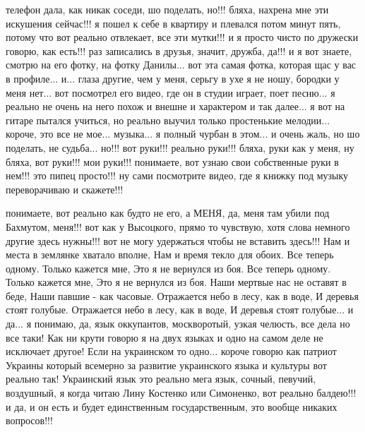 телефон дала, как никак соседи, шо поделать, но!!!
бляха, нахрена мне эти искушения сейчас!!!  я пошел к себе в квартиру и
плевался потом минут пять, потому что вот реально отвлекает, все эти мутки!!!
и я просто чисто по дружески говорю, как есть!!!  раз записались в друзья,
значит, дружба, да!!!  и я вот знаете, смотрю на его фотку, на фотку Данилы...
вот эта самая фотка, которая щас у вас в профиле...  и... глаза другие, чем у меня, серьгу
в ухе я не ношу, бородки у меня нет... вот посмотрел его видео, где он в студии
играет, поет песню...  я реально не очень на него похож и внешне и характером и
так далее... я вот на гитаре пытался учиться, но реально выучил только
простенькие мелодии... короче, это все не мое...  музыка... я полный чурбан в
этом...  и очень жаль, но шо поделать, не судьба...  но!!! вот руки!!! реально
руки!!! бляха, руки как у меня, ну бляха, вот руки!!!  мои руки!!! понимаете,
вот узнаю свои собственные руки в нем!!! это пипец просто!!!  ну сами
посмотрите видео, где я книжку под музыку переворачиваю и
скажете!!!

понимаете, вот реально как будто не его, а МЕНЯ, да, меня там убили под
Бахмутом, меня!!! вот как у Высоцкого, прямо то чувствую, хотя слова немного
другие здесь нужны!!!  вот не могу удержаться чтобы не вставить здесь!!!  Нам и
места в землянке хватало вполне, Нам и время текло для обоих.  Все теперь
одному. Только кажется мне, Это я не вернулся из боя.  Все теперь одному.
Только кажется мне, Это я не вернулся из боя.  Наши мертвые нас не оставят в
беде, Наши павшие - как часовые.  Отражается небо в лесу, как в воде, И деревья
стоят голубые.  Отражается небо в лесу, как в воде, И деревья стоят голубые... и
да... я понимаю, да, язык оккупантов, москворотый, узкая челюсть, все дела но
все таки!  Как ни крути говорю я на двух языках и одно на самом деле не
исключает другое!  Если на украинском то одно... короче говорю как патриот
Украины который всемерно за развитие украинского языка и культуры вот реально
так! Украинский язык это реально мега язык, сочный, певучий, воздушный, я когда
читаю Лину Костенко или Симоненко, вот реально балдею!!! и да, и он есть и
будет единственным
государственным, это вообще никаких вопросов!!! 

